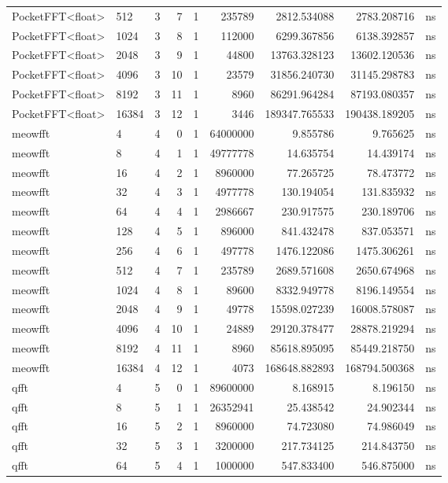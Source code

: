 \begin{tabular}{llrrrrrrl}
PocketFFT<float> & 512 & 3 & 7 & 1 & 235789 & 2812.534088 & 2783.208716 & ns \\
PocketFFT<float> & 1024 & 3 & 8 & 1 & 112000 & 6299.367856 & 6138.392857 & ns \\
PocketFFT<float> & 2048 & 3 & 9 & 1 & 44800 & 13763.328123 & 13602.120536 & ns \\
PocketFFT<float> & 4096 & 3 & 10 & 1 & 23579 & 31856.240730 & 31145.298783 & ns \\
PocketFFT<float> & 8192 & 3 & 11 & 1 & 8960 & 86291.964284 & 87193.080357 & ns \\
PocketFFT<float> & 16384 & 3 & 12 & 1 & 3446 & 189347.765533 & 190438.189205 & ns \\
meowfft & 4 & 4 & 0 & 1 & 64000000 & 9.855786 & 9.765625 & ns \\
meowfft & 8 & 4 & 1 & 1 & 49777778 & 14.635754 & 14.439174 & ns \\
meowfft & 16 & 4 & 2 & 1 & 8960000 & 77.265725 & 78.473772 & ns \\
meowfft & 32 & 4 & 3 & 1 & 4977778 & 130.194054 & 131.835932 & ns \\
meowfft & 64 & 4 & 4 & 1 & 2986667 & 230.917575 & 230.189706 & ns \\
meowfft & 128 & 4 & 5 & 1 & 896000 & 841.432478 & 837.053571 & ns \\
meowfft & 256 & 4 & 6 & 1 & 497778 & 1476.122086 & 1475.306261 & ns \\
meowfft & 512 & 4 & 7 & 1 & 235789 & 2689.571608 & 2650.674968 & ns \\
meowfft & 1024 & 4 & 8 & 1 & 89600 & 8332.949778 & 8196.149554 & ns \\
meowfft & 2048 & 4 & 9 & 1 & 49778 & 15598.027239 & 16008.578087 & ns \\
meowfft & 4096 & 4 & 10 & 1 & 24889 & 29120.378477 & 28878.219294 & ns \\
meowfft & 8192 & 4 & 11 & 1 & 8960 & 85618.895095 & 85449.218750 & ns \\
meowfft & 16384 & 4 & 12 & 1 & 4073 & 168648.882893 & 168794.500368 & ns \\
qfft & 4 & 5 & 0 & 1 & 89600000 & 8.168915 & 8.196150 & ns \\
qfft & 8 & 5 & 1 & 1 & 26352941 & 25.438542 & 24.902344 & ns \\
qfft & 16 & 5 & 2 & 1 & 8960000 & 74.723080 & 74.986049 & ns \\
qfft & 32 & 5 & 3 & 1 & 3200000 & 217.734125 & 214.843750 & ns \\
qfft & 64 & 5 & 4 & 1 & 1000000 & 547.833400 & 546.875000 & ns \\

\end{tabular}
